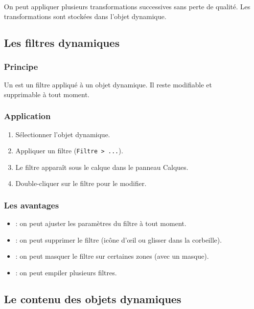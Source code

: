 On peut appliquer plusieurs transformations successives sans perte de qualité. Les transformations sont stockées dans l'objet dynamique.

\subsection{Les filtres dynamiques}

\subsubsection{Principe}

Un  est un filtre appliqué à un objet dynamique. Il reste modifiable et supprimable à tout moment.

\subsubsection{Application}

\begin{enumerate}
    \item Sélectionner l'objet dynamique.
    \item Appliquer un filtre (\texttt{Filtre > ...}).
    \item Le filtre apparaît sous le calque dans le panneau Calques.
    \item Double-cliquer sur le filtre pour le modifier.
\end{enumerate}

\subsubsection{Les avantages}

\begin{itemize}
    \item {} : on peut ajuster les paramètres du filtre à tout moment.
    \item {} : on peut supprimer le filtre (icône d'œil ou glisser dans la corbeille).
    \item {} : on peut masquer le filtre sur certaines zones (avec un masque).
    \item {} : on peut empiler plusieurs filtres.
\end{itemize}

\subsection{Le contenu des objets dynamiques}

